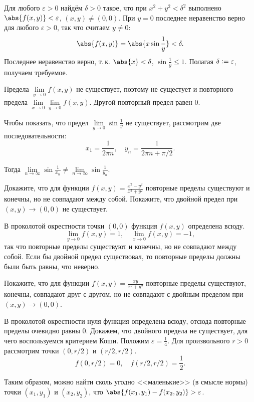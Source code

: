 \begin{solution}
    Для любого $\varepsilon > 0$ найдём $\delta > 0$ такое, что при $x^2 + y^2 < \delta^2$ выполнено $\abs{f(x, y)} < \varepsilon$, $(x, y) \ne (0, 0)$. При $y = 0$ последнее неравенство верно для любого $\varepsilon > 0$, так что считаем $y \ne 0$:
    \[
        \abs{f(x, y)} = \abs{x\sin\frac{1}{y}} < \delta.
    \]
    Последнее неравенство верно, т.\,к. $\abs{x} < \delta$, $\sin\frac{1}{y} \leqslant 1$. Полагая $\delta \vcentcolon = \varepsilon$, получаем требуемое.

    Предела $\lim\limits_{y \to 0}f(x, y)$ не существует, поэтому не сущестует и повторного предела $\lim\limits_{x \to 0}\lim\limits_{y \to 0}f(x, y)$. Другой повторный предел равен $0$.

    Чтобы показать, что предел $\lim\limits_{y \to 0}\sin\frac{1}{y}$ не существует, рассмотрим две последовательности:
    \[
        x_1 = \frac{1}{2\pi n},\quad y_n = \frac{1}{2\pi n + \pi / 2}.
    \]

    Тогда $\lim\limits_{n \to \infty}\sin\frac{1}{x_n} \ne \lim\limits_{n \to \infty}\sin\frac{1}{y_n}$.
\end{solution}

\begin{problem}[56]
    Докажите, что для функции $f(x, y) = \frac{x^2 - y^2}{x^2 + y^2}$ повторные пределы существуют и конечны, но не совпадают между собой. Покажите, что двойной предел при $(x, y) \to (0, 0)$ не существует.
\end{problem}

\begin{solution}
    В проколотой окрестности точки $(0, 0)$ функция $f(x, y)$ определена всюду.
    \[
        \lim_{y \to 0}f(x, y) = 1,\quad\lim_{x \to 0}f(x, y) = -1,
    \]
    так что повторные пределы существуют и конечны, но не совпадают между собой. Если бы двойной предел существовал, то повторные пределы должны были быть равны, что неверно.
\end{solution}

\begin{problem}[57]
    Покажите, что для функции $f(x, y) = \frac{xy}{x^2 + y^2}$ повторные пределы существуют, конечны, совпадают друг с другом, но не совпадают с двойным пределом при $(x, y) \to (0, 0)$.
\end{problem}

\begin{solution}
    В проколотой окрестности нуля функция определена всюду, отсюда повторные пределы очевидно равны $0$. Докажем, что двойного предела не существует, для чего воспользуемся критерием Коши. Положим $\varepsilon = \frac{1}{4}$. Для произвольного $r > 0$ рассмотрим точки $(0, r / 2)$ и $(r / 2, r / 2)$.
    \[
        f(0, r / 2) = 0,\quad f(r / 2, r / 2) = \frac{1}{2}.
    \]

    Таким образом, можно найти сколь угодно <<маленькие>> (в смысле нормы) точки $(x_1, y_1)$ и $(x_2, y_2)$, что $\abs{f(x_1, y_1) - f(x_2, y_2)} > \varepsilon$.
\end{solution}

